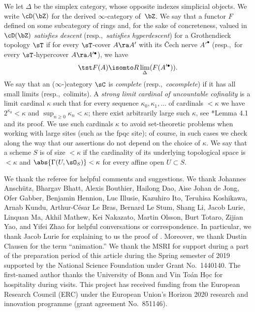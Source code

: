  We let $\Delta$ be the simplex category, whose opposite indexes simplicial objects. We write $\cD(\bZ)$ for the derived $\infty$-category of~$\bZ$.
 We say that a functor $F$ defined on some subcategory of rings and, for the sake of concreteness, valued in $\cD(\bZ)$ \emph{satisfies descent} (resp.,~\emph{satisfies hyperdescent}) for a Grothendieck topology $\sT$ if for every $\sT$-cover $A \ra A'$ with its \v{C}ech nerve $A'^\bullet$ (resp.,~for every $\sT$-hypercover $A \ra A'^\bullet$), we have
\[
\tst F(A) \isomto R\lim_{\Delta} (F(A'^\bullet)).
\]
We say that an ($\infty$-)category $\sC$ is \emph{complete} (resp.,~\emph{cocomplete}) if it has all small limits (resp.,~colimits). A \emph{strong limit cardinal of uncountable cofinality} is a limit cardinal $\kappa$ such that for every sequence $\kappa_0, \kappa_1, \dotsc$ of cardinals $< \kappa$ we have $2^{\kappa_0} < \kappa$ and $\sup_{n \ge 0} \kappa_n < \kappa$; there exist arbitrarily large such $\kappa$, see \cite{Sch17}*{Lemma 4.1 and its proof}. We use such cardinals $\kappa$ to avoid set-theoretic problems when working with large sites (such as the fpqc site); of course, in such cases we check along the way that our assertions do not depend on the choice of  $\kappa$. We say that a scheme $S$ is of size $<\kappa$ if the cardinality of its underlying topological space is $< \kappa$ and $\abs{\Gamma(U, \sO_S)} < \kappa$ for every affine open $U \subset S$.




\begin{pp-tweak}[\!\!Acknowledgements]
We thank the referee for helpful comments and suggestions. We thank Johannes Ansch\"{u}tz, Bhargav Bhatt, Alexis Bouthier, Hailong Dao, Aise Johan de Jong, Ofer Gabber, Benjamin Hennion, Luc Illusie, Kazuhiro Ito, Teruhisa Koshikawa, Arnab Kundu, Arthur-C\'{e}sar Le Bras,  Bernard Le Stum, Shang Li, Jacob Lurie, Linquan Ma, Akhil Mathew, Kei Nakazato, Martin Olsson, Burt Totaro, Zijian Yao, and Yifei Zhao for helpful conversations or correspondence. In particular, we thank Jacob Lurie for explaining to us the proof of . Moreover, we thank Dustin Clausen for the term ``animation.'' We thank the MSRI for support during a part of the preparation period of this article during the Spring semester of 2019 supported by the National Science Foundation under Grant No.~1440140. The first-named author thanks the University of Bonn and Vin To\'{a}n H\d{o}c for hospitality during visits. This project has received funding from the European Research Council (ERC) under the European Union's Horizon 2020 research and innovation programme (grant agreement No.~851146).
\end{pp-tweak}





